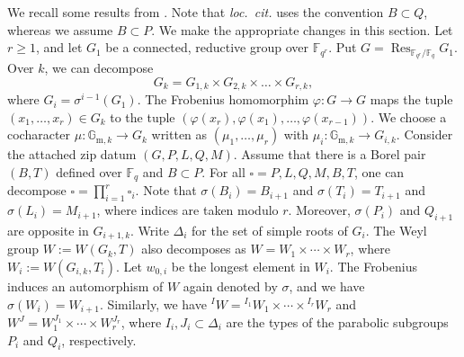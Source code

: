 \documentclass[11pt]{amsart}
\numberwithin{equation}{section}
\theoremstyle{definition}
\theoremstyle{remark}
\newcommand{\FF}{\mathbb{F}}
\newcommand{\GG}{\mathbb{G}}
\newcommand{\loccit}{{\em loc.\ cit. }} %
\DeclareMathOperator{\Res}{Res}
\begin{document}
We recall some results from \cite[Section~4]{Koskivirta-Wedhorn-Hasse}. Note that \loccit uses the convention $B\subset Q$, whereas we assume $B\subset P$. We make the appropriate changes in this section. Let $r\geq 1$, and let $G_1$ be a connected, reductive group over $\FF_{q^r}$. Put $G=\Res_{\FF_{q^r}/\FF_q} G_1$. Over $k$, we can decompose
\begin{equation}
    G_k=G_{1,k}\times G_{2,k} \times \dots \times G_{r,k}, 
\end{equation}
where $G_i=\sigma^{i-1}(G_1)$. The Frobenius homomorphim $\varphi \colon G\to G$ maps the tuple $(x_1, \dots , x_r)\in G_k$ to the tuple $(\varphi(x_r),\varphi(x_1), \dots , \varphi(x_{r-1}))$. We choose a cocharacter $\mu\colon \GG_{\mathrm{m},k}\to G_k$ written as $(\mu_1, \dots , \mu_r)$ with $\mu_i\colon \GG_{\mathrm{m},k}\to G_{i,k}$. Consider the attached zip datum $(G,P,L,Q,M)$. Assume that there is a Borel pair $(B,T)$ defined over $\FF_q$ and $B\subset P$. For all $\square=P,L,Q,M,B,T$, one can decompose $\square=\prod_{i=1}^r \square_i$. Note that $\sigma(B_i) = B_{i+1}$ and $\sigma(T_i) = T_{i+1}$ and $\sigma(L_i)=M_{i+1}$, where indices are taken modulo $r$. Moreover, $\sigma(P_i)$ and $Q_{i+1}$ are opposite in $G_{i+1,k}$. Write $\Delta_i$ for the set of simple roots of $G_i$. The Weyl group $W:=W(G_k,T)$ also decomposes  as $W = W_{1} \times \cdots \times W_{r}$, where $W_i:=W(G_{i,k},T_i)$. Let $w_{0,i}$ be the longest element in $W_i$. The Frobenius induces an automorphism of $W$ again denoted by $\sigma$, and we have $\sigma(W_i) = W_{i+1}$. Similarly, we have ${}^I W={}^{I_1} W_1\times\cdots\times {}^{I_r} W_r$ and $W^J=W_1^{J_1}\times\cdots\times W_r^{J_r}$, 
where $I_{i}, J_i\subset \Delta_{i}$ are the types of the parabolic subgroups $P_{i}$ and $Q_i$, respectively.
\end{document}
